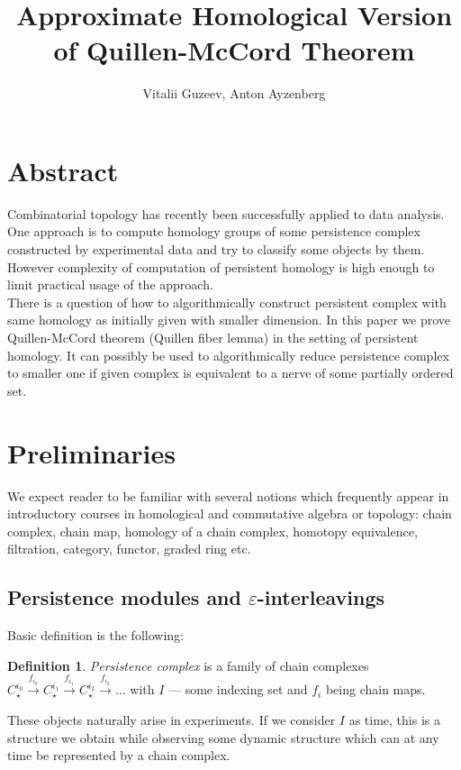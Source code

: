 \documentclass[a4paper, 12pt]{article}
\title{Approximate Homological Version of Quillen-McCord Theorem}
\author{Vitalii Guzeev, Anton Ayzenberg}
\theoremstyle{definition}
\newtheorem{definition}{Definition}
\theoremstyle{remark}
\newcommand{\define}[1]{{\textit{#1}}}
\begin{document}
\section{Abstract}

Combinatorial topology has recently been successfully applied to data analysis. One approach is to compute homology groups of some persistence complex constructed by experimental data and try to classify some objects by them. However complexity of computation of persistent homology is high enough to limit practical usage of the approach.\\

There is a question of how to algorithmically construct persistent complex with same homology as initially given with smaller dimension. In this paper we prove Quillen-McCord theorem (Quillen fiber lemma) in the setting of persistent homology. It can possibly be used to algorithmically reduce persistence complex to smaller one if given complex is equivalent to a nerve of some partially ordered set.

\section{Preliminaries}

We expect reader to be familiar with several notions which frequently appear in introductory courses in homological and commutative algebra or topology: chain complex, chain map, homology of a chain complex, homotopy equivalence, filtration, category, functor, graded ring etc.\\

\subsection{Persistence modules and $\varepsilon$-interleavings}

Basic definition is the following:

\begin{definition}
  \define{Persistence complex} is a family of chain complexes $C_{\star}^{i_0} \xrightarrow{f_{i_0}} C_{\star}^{i_1} \xrightarrow{f_{i_1}} C_{\star}^{i_2} \xrightarrow{f_{i_2}} \ldots$ with $I$ --- some indexing set and $f_i$ being chain maps.
\end{definition}

These objects naturally arise in experiments. If we consider $I$ as time, this is a structure we obtain while observing some dynamic structure which can at any time be represented by a chain complex.\\
\end{document}
